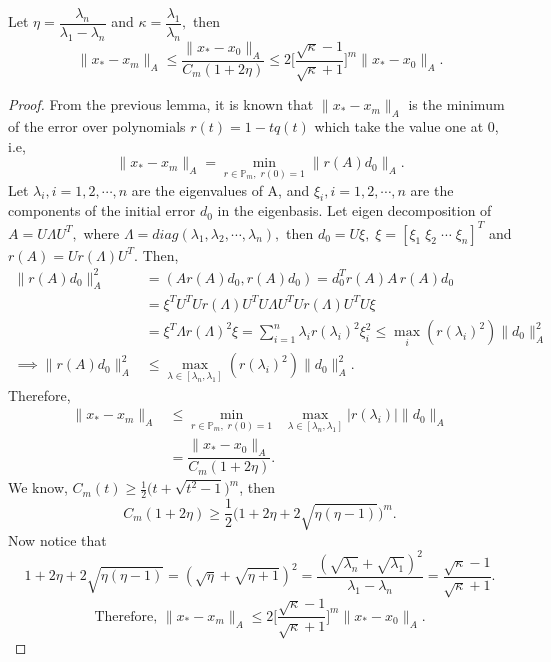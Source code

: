\documentclass[10pt,a4paper]{article}
\begin{document}
\begin{theorem}
Let $\eta=\dfrac{\lambda_n}{\lambda_1-\lambda_n}$ and $\kappa = \dfrac{\lambda_1}{\lambda_n},$ then
$$\|x_*-x_m\|_A\le \dfrac{\|x_*-x_0\|_A}{C_m(1+2\eta)}\le 2\bigg[\dfrac{\sqrt{\kappa}-1}{\sqrt{\kappa}+1}\bigg]^m\|x_*-x_0\|_A.$$
\end{theorem}

\begin{proof}
From the previous lemma, it is known that $\|x_*-x_m\|_A$ is the minimum of the error over polynomials $r(t)=1-tq(t)$ which take the value one at 0, i.e,
$$\|x_*-x_m\|_A=\underset{r\in \mathbb{P}_m,\;r(0)=1}{\min}\|r(A)d_0\|_A.$$
Let $\lambda_i,i=1,2,\cdots,n$ are the eigenvalues of A, and $\xi_i,i=1,2,\cdots,n$ are the components of the initial error $d_0$ in the eigenbasis. Let eigen decomposition of $A=U\Lambda U^T,$ where $\Lambda=diag(\lambda_1,\lambda_2,\cdots,\lambda_n),$ then $d_0=U\xi,\;\xi=[\xi_1\;\xi_2\;\cdots\;\xi_n]^T$ and $r(A)=Ur(\Lambda)U^T$. Then,
\begin{align*}
\|r(A)d_0\|^2_A &= (Ar(A)d_0,r(A)d_0) = d^T_0r(A)A\,r(A)d_0 \\
&= \xi^TU^TUr(\Lambda)U^TU{\Lambda}U^TUr(\Lambda)U^T U\xi \\
&= \xi^T \Lambda r(\Lambda)^2\xi = \sum^n_{i=1}\lambda_ir(\lambda_i)^2\xi^2_i \le \underset{i}{\max}(r(\lambda_i)^2)\|d_0\|^2_A \\
\implies \|r(A)d_0\|^2_A &\le \underset{\lambda\in[\lambda_n,\lambda_1]}{\max}(r(\lambda_i)^2)\|d_0\|^2_A.
\end{align*}
Therefore,
\begin{align*}
\|x_*-x_m\|_A&\le\underset{r\in \mathbb{P}_m,\;r(0)=1}{\min}\;\;\underset{\lambda\in[\lambda_n,\lambda_1]}{\max}|r(\lambda_i)|\|d_0\|_A \\
&= \dfrac{\|x_*-x_0\|_A}{C_m(1+2\eta)}.
\end{align*}
We know, $C_m(t)\ge \frac{1}{2}\Big(t+\sqrt{t^2-1}\Big)^m$, then 
$$C_m(1+2\eta)\ge \frac{1}{2}\Big(1+2\eta+2\sqrt{\eta(\eta-1)}\Big)^m.$$
Now notice that
$$1+2\eta+2\sqrt{\eta(\eta-1)} = (\sqrt{\eta}+\sqrt{\eta+1})^2  = \dfrac{(\sqrt{\lambda_n}+\sqrt{\lambda_1})^2}{\lambda_1-\lambda_n} = \dfrac{\sqrt{\kappa}-1}{\sqrt{\kappa}+1}.$$
$$\text{Therefore, }\|x_*-x_m\|_A\le 2\bigg[\dfrac{\sqrt{\kappa}-1}{\sqrt{\kappa}+1}\bigg]^m\|x_*-x_0\|_A.$$
\end{proof}
\end{document}
